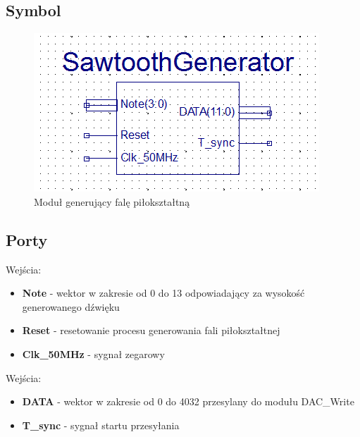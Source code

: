 \documentclass[a4paper]{report}
\begin{document}
		\subsection{Symbol}
			\begin{figure}[h!]
				\centering
				\includegraphics{sawtoothgenerator2.png}
				\caption{Moduł generujący falę piłokształtną}
			\end{figure}
		\subsection{Porty}
		{\Large Wejścia:}
			\begin{itemize}	 
				\item \textbf{Note} - wektor w zakresie od 0 do 13 odpowiadający za wysokość generowanego dźwięku
				\item 			\textbf{Reset} - resetowanie procesu generowania fali piłokształtnej
				\item			\textbf{Clk\_50MHz} - sygnał zegarowy
			\end{itemize}
		{\Large Wejścia:}
			\begin{itemize} 
				\item 			\textbf{DATA} - wektor w zakresie od 0 do 4032 przesylany do modułu DAC\_Write
				\item 						\textbf{T\_sync} - sygnał startu przesyłania
			\end{itemize}
\end{document}

